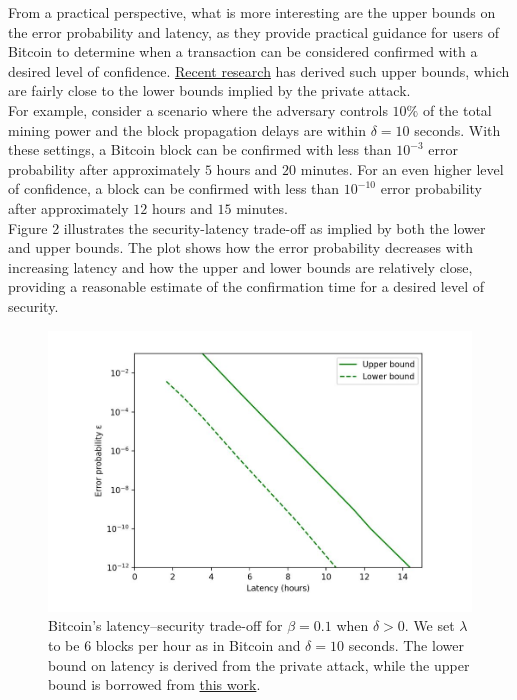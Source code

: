From a practical perspective, what is more interesting are the upper bounds on the error probability and latency, as they provide practical guidance for users of Bitcoin to determine when a transaction can be considered confirmed with a desired level of confidence. \href{https://arxiv.org/pdf/2011.14051.pdf}{Recent research} has derived such upper bounds, which are fairly close to the lower bounds implied by the private attack.\\
For example, consider a scenario where the adversary controls $10\%$ of the total mining power and the block propagation delays are within $\delta = 10$ seconds. With these settings, a Bitcoin block can be confirmed with less than $10^{-3}$ error probability after approximately $5$ hours and $20$ minutes. For an even higher level of confidence, a block can be confirmed with less than $10^{-10}$ error probability after approximately $12$ hours and $15$ minutes.\\
Figure 2 illustrates the security-latency trade-off as implied by both the lower and upper bounds. The plot shows how the error probability decreases with increasing latency and how the upper and lower bounds are relatively close, providing a reasonable estimate of the confirmation time for a desired level of security.
\begin{center}
	\begin{figure}
		\centering
		\includegraphics[width=0.8\linewidth]{Fig/9/F2}
		\caption{Bitcoin’s latency–security trade-oﬀ for $\beta = 0.1$ when $\delta > 0$. We set $\lambda$ to be $6$ blocks per hour as in Bitcoin and $\delta = 10$ seconds. The lower bound on latency is derived from the private attack, while the upper bound is borrowed from \href{https://arxiv.org/pdf/2011.14051.pdf}{this work}.}
		\label{fig:f1}
	\end{figure}
\end{center}
